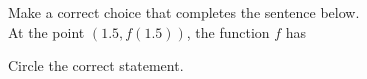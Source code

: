 \documentclass{ximera}
\begin{document}
\begin{question}
 Make a correct choice that completes the sentence below. \\
 
  At the point $(1.5,f(1.5))$, the  function $f$ has 

  \begin{multipleChoice}
  \end{multipleChoice}
  \end{question}
  \begin{question}
Circle the correct statement.
  \begin{multipleChoice}
  \end{multipleChoice}
\end{question}
\end{document}
